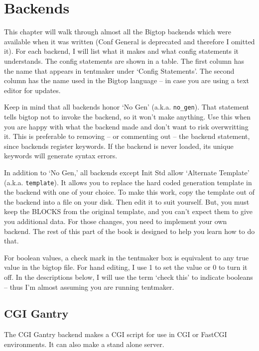 \chapter{Backends}
\label{chap:backends}

This chapter will walk through almost all the Bigtop backends which were
available when it was written (Conf General is deprecated and therefore
I omitted it).  For each backend, I will list what it makes and what config
statements it understands.  The config statements are shown in a table.
The first column has the name that appears in tentmaker under `Config
Statements'.  The second column has the name used in the Bigtop language
-- in case you are using a text editor for updates.

Keep in mind that all backends honor `No Gen' (a.k.a. \verb+no_gen+).
That statement tells bigtop not to invoke the backend, so it won't make
anything.  Use this when you are happy with what the backend made and
don't want to risk overwritting it.  This is preferable to removing
-- or commenting out -- the backend statement, since backends register
keywords.  If the backend is never loaded, its unique keywords will
generate syntax errors.

In addition to `No Gen,' all backends except Init Std allow
`Alternate Template' (a.k.a. \verb+template+).  It allows you to
replace the hard coded generation template in the backend with
one of your choice.  To make this work, copy the template out of the
backend into a file on your disk.  Then edit it to suit yourself.
But, you must keep the BLOCKS from the original template, and you can't
expect them to give you additional data.  For those changes, you need
to implement your own backend.  The rest of this part of the book
is designed to help you learn how to do that.

For boolean values, a check mark in the tentmaker box is equivalent to
any true value in the bigtop file.  For hand editing, I use 1
to set the value or 0 to turn it off.  In the descriptions below, I
will use the term `check this' to indicate booleans -- thus I'm almost
assuming you are running tentmaker.

\section{CGI Gantry}

The CGI Gantry backend makes a CGI script for use in CGI or FastCGI
environments.  It can also make a stand alone server.

